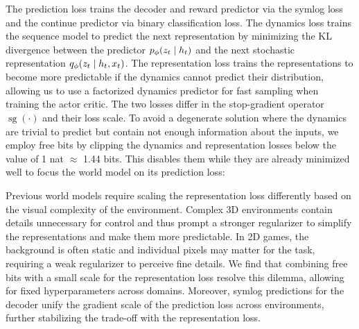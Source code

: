 
\vspace*{-3ex}

The prediction loss trains the decoder and reward predictor via the symlog loss and the continue predictor via binary classification loss.
The dynamics loss trains the sequence model to predict the next representation by minimizing the KL divergence between the predictor $\pp(z_t|h_t)$ and the next stochastic representation $\qp(z_t|h_t,x_t)$.
The representation loss trains the representations to become more predictable if the dynamics cannot predict their distribution, allowing us to use a factorized dynamics predictor for fast sampling when training the actor critic.
The two losses differ in the stop-gradient operator $\operatorname{sg}(\cdot)$ and their loss scale.
To avoid a degenerate solution where the dynamics are trivial to predict but contain not enough information about the inputs, we employ free bits\citep{kingma2016freebits} by clipping the dynamics and representation losses below the value of 1 nat $\approx$ 1.44 bits.
This disables them while they are already minimized well to focus the world model on its prediction loss:



Previous world models require scaling the representation loss differently based on the visual complexity of the environment.
Complex 3D environments contain details unnecessary for control and thus prompt a stronger regularizer to simplify the representations and make them more predictable.
In 2D games, the background is often static and individual pixels may matter for the task, requiring a weak regularizer to perceive fine details.
We find that combining free bits with a small scale for the representation loss resolve this dilemma, allowing for fixed hyperparameters across domains.
Moreover, symlog predictions for the decoder unify the gradient scale of the prediction loss across environments, further stabilizing the trade-off with the representation loss.

